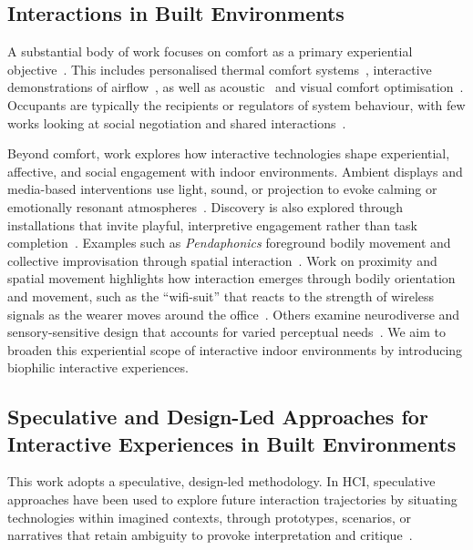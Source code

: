 \subsection{Interactions in Built Environments}
A substantial body of work focuses on comfort as a primary experiential objective~\cite{alavi2017comfort, alavi2020five}. This includes personalised thermal comfort systems~\cite{jazizadeh2014human, khare2023thermal}, interactive demonstrations of airflow~\cite{zhong2020hilo, snow2019performance, gaver2013indoor}, as well as acoustic~\cite{marques2020real, choi2009decision} and visual comfort optimisation~\cite{bian2023simulation, zheng2023daylighting}. Occupants are typically the recipients or regulators of system behaviour, with few works looking at social negotiation and shared interactions~\cite{clear2018thermokiosk, von2021towards, clear2017d}.

Beyond comfort, work explores how interactive technologies shape experiential, affective, and social engagement with indoor environments. Ambient displays and media-based interventions use light, sound, or projection to evoke calming or emotionally resonant atmospheres~\cite{feng2019livenature, behrens2018sentiment, rao2023towards}.  Discovery is also explored through installations that invite playful, interpretive engagement rather than task completion~\cite{gaver2006history, wiberg2020interaction}. Examples such as \emph{Pendaphonics} foreground bodily movement and collective improvisation through spatial interaction~\cite{hansen2009pendaphonics}. Work on proximity and spatial movement highlights how interaction emerges through bodily orientation and movement, such as the ``wifi-suit'' that reacts to the strength of wireless signals as the wearer moves around the office~\cite{van2018skin}. Others examine neurodiverse and sensory-sensitive design that accounts for varied perceptual needs~\cite{swaminathan2021tactile, garzotto2020interactive}. We aim to broaden this experiential scope of interactive indoor environments by introducing biophilic interactive experiences.  

\subsection{Speculative and Design-Led Approaches for Interactive Experiences in Built Environments}
This work adopts a speculative, design-led methodology. In HCI, speculative approaches have been used to explore future interaction trajectories by situating technologies within imagined contexts, through prototypes, scenarios, or narratives 
that retain ambiguity to provoke interpretation and critique~\cite{galloway2018speculative, lee2025speculative}.

